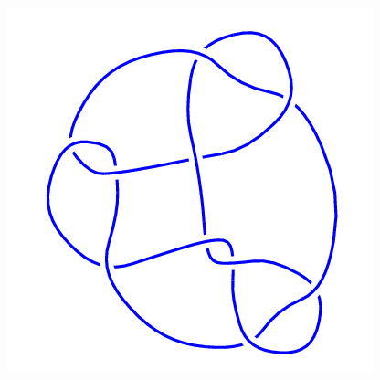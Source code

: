 \begin{figure}[H]
\begin{minipage}[b]{.18\linewidth}
    \end{minipage}
    \begin{minipage}[b]{.18\linewidth}
        \centering
        \includegraphics[width=\linewidth]{../data/10_71.png}
    \end{minipage}
\end{figure}

